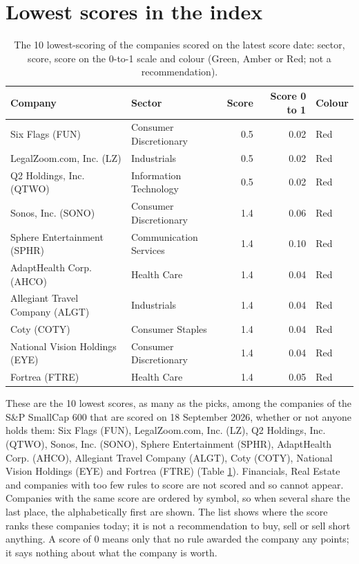 \documentclass[11pt,a4paper]{article}
\begin{document}
\section{Lowest scores in the index}
\label{sec:worst}
\begin{table}[H]
\centering
\small
\caption{The 10 lowest-scoring of the companies scored on the latest score date: sector, score, score on the 0-to-1 scale and colour (Green, Amber or Red; not a recommendation).}\label{tab:worst}
\begin{tabular}{p{4.4cm} p{3cm} r r p{3cm}}
\hline
Company & Sector & Score & Score 0 to 1 & Colour \\
\hline
Six Flags (FUN) & Consumer Discretionary & 0.5 & 0.02 & \cellcolor[HTML]{F4B6B6}Red \\
LegalZoom.com, Inc. (LZ) & Industrials & 0.5 & 0.02 & \cellcolor[HTML]{F4B6B6}Red \\
Q2 Holdings, Inc. (QTWO) & Information Technology & 0.5 & 0.02 & \cellcolor[HTML]{F4B6B6}Red \\
Sonos, Inc. (SONO) & Consumer Discretionary & 1.4 & 0.06 & \cellcolor[HTML]{F4B6B6}Red \\
Sphere Entertainment (SPHR) & Communication Services & 1.4 & 0.10 & \cellcolor[HTML]{F4B6B6}Red \\
AdaptHealth Corp. (AHCO) & Health Care & 1.4 & 0.04 & \cellcolor[HTML]{F4B6B6}Red \\
Allegiant Travel Company (ALGT) & Industrials & 1.4 & 0.04 & \cellcolor[HTML]{F4B6B6}Red \\
Coty (COTY) & Consumer Staples & 1.4 & 0.04 & \cellcolor[HTML]{F4B6B6}Red \\
National Vision Holdings (EYE) & Consumer Discretionary & 1.4 & 0.04 & \cellcolor[HTML]{F4B6B6}Red \\
Fortrea (FTRE) & Health Care & 1.4 & 0.05 & \cellcolor[HTML]{F4B6B6}Red \\
\hline
\end{tabular}
\end{table}
These are the 10 lowest scores, as many as the picks, among the companies of the S\&P SmallCap 600 that are scored on 18 September 2026, whether or not anyone holds them: Six Flags (FUN), LegalZoom.com, Inc. (LZ), Q2 Holdings, Inc. (QTWO), Sonos, Inc. (SONO), Sphere Entertainment (SPHR), AdaptHealth Corp. (AHCO), Allegiant Travel Company (ALGT), Coty (COTY), National Vision Holdings (EYE) and Fortrea (FTRE) (Table \ref{tab:worst}). Financials, Real Estate and companies with too few rules to score are not scored and so cannot appear. Companies with the same score are ordered by symbol, so when several share the last place, the alphabetically first are shown. The list shows where the score ranks these companies today; it is not a recommendation to buy, sell or sell short anything. A score of 0 means only that no rule awarded the company any points; it says nothing about what the company is worth.
\end{document}
